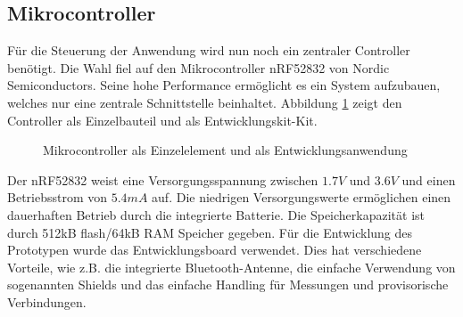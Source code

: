 \subsection{Mikrocontroller} \label{sec:microcontrollerHardware}
Für die Steuerung der Anwendung wird nun noch ein zentraler Controller benötigt. Die Wahl fiel auf den Mikrocontroller nRF52832 von Nordic Semiconductors. Seine hohe Performance ermöglicht es ein System aufzubauen, welches nur eine zentrale Schnittstelle beinhaltet. Abbildung \ref{fig:nRF52832} zeigt den Controller als Einzelbauteil und als Entwicklungskit-Kit.


\begin{figure}[H]
	\centering
	\quad
	\quad
	\caption[Mikrocontroller NRF52832  \cite{nRF52832}  \cite{nRF52-DK}]{Mikrocontroller als Einzelelement und als Entwicklungsanwendung}
	\label{fig:nRF52832}
\end{figure}

Der nRF52832 weist eine Versorgungsspannung zwischen $1.7V$ und $3.6V$ und einen Betriebsstrom von $5.4mA$ auf. Die niedrigen Versorgungswerte ermöglichen einen dauerhaften Betrieb durch die integrierte Batterie. Die Speicherkapazität ist durch 512kB flash/64kB RAM Speicher gegeben. Für die Entwicklung des Prototypen wurde das Entwicklungsboard verwendet. Dies hat verschiedene Vorteile, wie z.B. die integrierte Bluetooth-Antenne, die einfache Verwendung von sogenannten Shields und das einfache Handling für Messungen und provisorische Verbindungen.